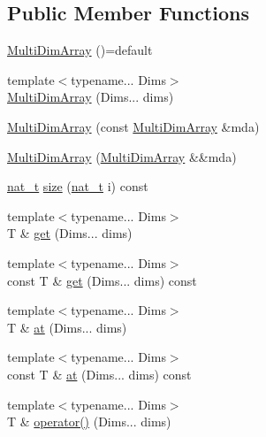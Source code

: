 \subsection*{Public Member Functions}
\begin{DoxyCompactItemize}
\item 
\hyperlink{class_designar_1_1_multi_dim_array_a52a96f1eeb1176cc18d6329ab75e59f8}{Multi\+Dim\+Array} ()=default
\item 
{\footnotesize template$<$typename... Dims$>$ }\\\hyperlink{class_designar_1_1_multi_dim_array_a87e9b411cccc10d39117d1ccdcd66261}{Multi\+Dim\+Array} (Dims... dims)
\item 
\hyperlink{class_designar_1_1_multi_dim_array_a4dd6166b45028efc4bab7cd42c492663}{Multi\+Dim\+Array} (const \hyperlink{class_designar_1_1_multi_dim_array}{Multi\+Dim\+Array} \&mda)
\item 
\hyperlink{class_designar_1_1_multi_dim_array_aaa91d894b0e4065cba28a9066c0513b8}{Multi\+Dim\+Array} (\hyperlink{class_designar_1_1_multi_dim_array}{Multi\+Dim\+Array} \&\&mda)
\item 
\hyperlink{namespace_designar_aa72662848b9f4815e7bf31a7cf3e33d1}{nat\+\_\+t} \hyperlink{class_designar_1_1_multi_dim_array_a39d5dcd40ce04bf3113c0f6d83805d0a}{size} (\hyperlink{namespace_designar_aa72662848b9f4815e7bf31a7cf3e33d1}{nat\+\_\+t} i) const
\item 
{\footnotesize template$<$typename... Dims$>$ }\\T \& \hyperlink{class_designar_1_1_multi_dim_array_a27a85daef556fb6cdb3f0c0b0d16e4d0}{get} (Dims... dims)
\item 
{\footnotesize template$<$typename... Dims$>$ }\\const T \& \hyperlink{class_designar_1_1_multi_dim_array_a36ba716b359942501b9cd6d96562e774}{get} (Dims... dims) const
\item 
{\footnotesize template$<$typename... Dims$>$ }\\T \& \hyperlink{class_designar_1_1_multi_dim_array_a35f5b6b915a03e4ba04ccd28af40dc79}{at} (Dims... dims)
\item 
{\footnotesize template$<$typename... Dims$>$ }\\const T \& \hyperlink{class_designar_1_1_multi_dim_array_aa6c5641e0839fae2bc8d1dadc134cc71}{at} (Dims... dims) const
\item 
{\footnotesize template$<$typename... Dims$>$ }\\T \& \hyperlink{class_designar_1_1_multi_dim_array_a9547e76013b4f532de026ec425ad4f7a}{operator()} (Dims... dims)

\end{DoxyCompactItemize}
